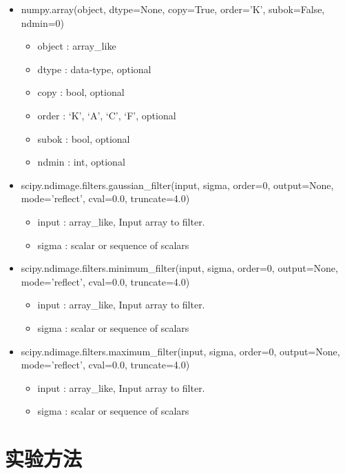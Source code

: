 \documentclass[11pt]{ctexart}
\begin{document}
    \begin{itemize}
    \item numpy.array(object, dtype=None, copy=True, order='K', subok=False, ndmin=0)
    \begin{itemize}
        \item object : array\_like
        \item dtype : data-type, optional
        \item copy : bool, optional
        \item order : {‘K’, ‘A’, ‘C’, ‘F’}, optional
        \item subok : bool, optional
        \item ndmin : int, optional
    \end{itemize}

    \item scipy.ndimage.filters.gaussian\_filter(input, sigma, order=0, output=None, mode='reflect', cval=0.0, truncate=4.0)
    \begin{itemize}
        \item input : array\_like, Input array to filter.
        \item sigma : scalar or sequence of scalars
    \end{itemize}


   \item scipy.ndimage.filters.minimum\_filter(input, sigma, order=0, output=None, mode='reflect', cval=0.0, truncate=4.0)
    \begin{itemize}
        \item input : array\_like, Input array to filter.
        \item sigma : scalar or sequence of scalars
    \end{itemize}

\item scipy.ndimage.filters.maximum\_filter(input, sigma, order=0, output=None, mode='reflect', cval=0.0, truncate=4.0)
    \begin{itemize}
        \item input : array\_like, Input array to filter.
        \item sigma : scalar or sequence of scalars
    \end{itemize}
\end{itemize}

\section{实验方法}
\end{document}
